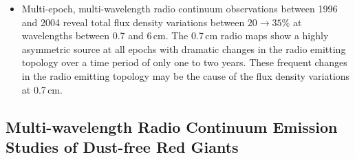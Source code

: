 \begin{itemize}
\item Multi-epoch, multi-wavelength radio continuum observations between 1996 and 2004 reveal total flux density variations between $20\rightarrow 35\%$ at wavelengths between 0.7 and 6\,cm. The 0.7\,cm radio maps show a highly asymmetric source at all epochs with dramatic changes in the radio emitting topology over a time period of only one to two years. These frequent changes in the radio emitting topology may be the cause of the flux density variations at 0.7\,cm.
  
\end{itemize}


\subsection{Multi-wavelength Radio Continuum Emission Studies of Dust-free Red Giants}\label{sec:8.1.2}

